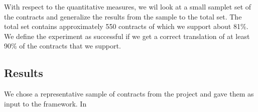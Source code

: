 With respect to the quantitative measures, we wil look at a small samplet set of the contracts and generalize the results from the sample to the total set. The total set contains approximately 550 contracts of which we support about 81\%. We define the experiment as successful if we get a correct translation of at least 90\% of the contracts that we support.

\subsection{Results}

We chose a representative sample of contracts from the project and gave them as input to the framework. In 



